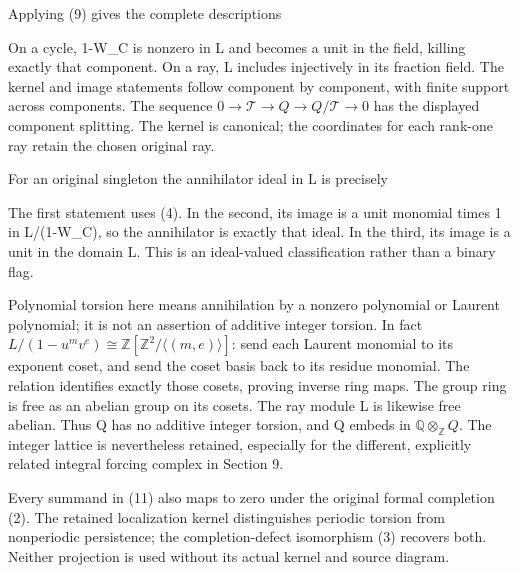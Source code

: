 Applying (9) gives the complete descriptions


On a cycle, 1-W\_C is nonzero in L and becomes a unit in the field,
killing exactly that component. On a ray, L includes injectively in its
fraction field. The kernel and image statements follow component by
component, with finite support across components. The sequence
\(0\to\mathcal T\to Q\to Q/\mathcal T\to0\) has the displayed component
splitting. The kernel is canonical; the coordinates for each rank-one
ray retain the chosen original ray.

For an original singleton the annihilator ideal in L is precisely


The first statement uses (4). In the second, its image is a unit
monomial times 1 in L/(1-W\_C), so the annihilator is exactly that
ideal. In the third, its image is a unit in the domain L. This is an
ideal-valued classification rather than a binary flag.

Polynomial torsion here means annihilation by a nonzero polynomial or
Laurent polynomial; it is not an assertion of additive integer torsion.
In fact
\(L/(1-u^m v^e)\cong\mathbb Z[\mathbb Z^2/\langle(m,e)\rangle]\): send
each Laurent monomial to its exponent coset, and send the coset basis
back to its residue monomial. The relation identifies exactly those
cosets, proving inverse ring maps. The group ring is free as an abelian
group on its cosets. The ray module L is likewise free abelian. Thus Q
has no additive integer torsion, and Q embeds in
\(\mathbb Q\otimes_{\mathbb Z}Q\). The integer lattice is nevertheless
retained, especially for the different, explicitly related integral
forcing complex in Section 9.

Every summand in (11) also maps to zero under the original formal
completion (2). The retained localization kernel distinguishes periodic
torsion from nonperiodic persistence; the completion-defect isomorphism
(3) recovers both. Neither projection is used without its actual kernel
and source diagram.

